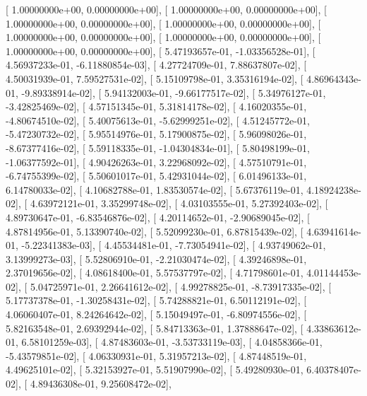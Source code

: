 \documentclass{article}
\begin{document}
       [  1.00000000e+00,   0.00000000e+00],
       [  1.00000000e+00,   0.00000000e+00],
       [  1.00000000e+00,   0.00000000e+00],
       [  1.00000000e+00,   0.00000000e+00],
       [  1.00000000e+00,   0.00000000e+00],
       [  1.00000000e+00,   0.00000000e+00],
       [  1.00000000e+00,   0.00000000e+00],
       [  5.47193657e-01,  -1.03356528e-01],
       [  4.56937233e-01,  -6.11880854e-03],
       [  4.27724709e-01,   7.88637807e-02],
       [  4.50031939e-01,   7.59527531e-02],
       [  5.15109798e-01,   3.35316194e-02],
       [  4.86964343e-01,  -9.89338914e-02],
       [  5.94132003e-01,  -9.66177517e-02],
       [  5.34976127e-01,  -3.42825469e-02],
       [  4.57151345e-01,   5.31814178e-02],
       [  4.16020355e-01,  -4.80674510e-02],
       [  5.40075613e-01,  -5.62999251e-02],
       [  4.51245772e-01,  -5.47230732e-02],
       [  5.95514976e-01,   5.17900875e-02],
       [  5.96098026e-01,  -8.67377416e-02],
       [  5.59118335e-01,  -1.04304834e-01],
       [  5.80498199e-01,  -1.06377592e-01],
       [  4.90426263e-01,   3.22968092e-02],
       [  4.57510791e-01,  -6.74755399e-02],
       [  5.50601017e-01,   5.42931044e-02],
       [  6.01496133e-01,   6.14780033e-02],
       [  4.10682788e-01,   1.83530574e-02],
       [  5.67376119e-01,   4.18924238e-02],
       [  4.63972121e-01,   3.35299748e-02],
       [  4.03103555e-01,   5.27392403e-02],
       [  4.89730647e-01,  -6.83546876e-02],
       [  4.20114652e-01,  -2.90689045e-02],
       [  4.87814956e-01,   5.13390740e-02],
       [  5.52099230e-01,   6.87815439e-02],
       [  4.63941614e-01,  -5.22341383e-03],
       [  4.45534481e-01,  -7.73054941e-02],
       [  4.93749062e-01,   3.13999273e-03],
       [  5.52806910e-01,  -2.21030474e-02],
       [  4.39246898e-01,   2.37019656e-02],
       [  4.08618400e-01,   5.57537797e-02],
       [  4.71798601e-01,   4.01144453e-02],
       [  5.04725971e-01,   2.26641612e-02],
       [  4.99278825e-01,  -8.73917335e-02],
       [  5.17737378e-01,  -1.30258431e-02],
       [  5.74288821e-01,   6.50112191e-02],
       [  4.06060407e-01,   8.24264642e-02],
       [  5.15049497e-01,  -6.80974556e-02],
       [  5.82163548e-01,   2.69392944e-02],
       [  5.84713363e-01,   1.37888647e-02],
       [  4.33863612e-01,   6.58101259e-03],
       [  4.87483603e-01,  -3.53733119e-03],
       [  4.04858366e-01,  -5.43579851e-02],
       [  4.06330931e-01,   5.31957213e-02],
       [  4.87448519e-01,   4.49625101e-02],
       [  5.32153927e-01,   5.51907990e-02],
       [  5.49280930e-01,   6.40378407e-02],
       [  4.89436308e-01,   9.25608472e-02],
\end{document}
